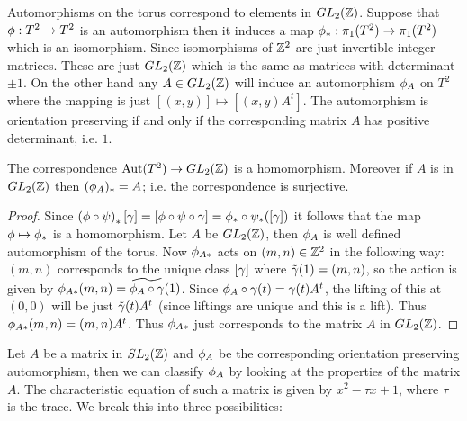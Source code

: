   Automorphisms on the torus correspond to elements in $GL_2(\mathbb{Z})$. Suppose that $\phi:T^2 \to T^2$ is an automorphism then it induces a map $\phi_* :\pi_1(T^2) \to \pi_1(T^2)$ which is an isomorphism. Since isomorphisms of $\mathbb{Z}^2$ are just invertible integer matrices. These are just $GL_2(\mathbb{Z})$ which is the same as matrices with determinant $\pm 1$. On the other hand any $A\in GL_2(\mathbb{Z})$ will induce an automorphism $\phi_A$ on $T^2$ where the mapping is just $[(x,y)] \mapsto [(x,y)A^t]$. The automorphism is orientation preserving if and only if the corresponding matrix $A$ has positive determinant, i.e. $1$.
\begin{proposition}
  The correspondence $\text{Aut}(T^2) \to GL_2(\mathbb{Z})$ is a homomorphism. Moreover if $A$ is in $GL_2(\mathbb{Z})$ then $(\phi_A)_* = A$; i.e. the correspondence is surjective.
\end{proposition}
\begin{proof}
  Since $\left(\phi\circ \psi\right)_*[\gamma] = [\phi\circ\psi \circ \gamma] = \phi_*\circ \psi_*([\gamma])$ it follows that the map $\phi \mapsto \phi_*$ is a homomorphism. Let $A$ be $GL_2(\mathbb{Z})$, then $\phi_A$ is well defined automorphism of the torus. Now $\phi_{A*}$ acts on $(m,n)\in \mathbb{Z}^2$ in the following way: $(m,n)$ corresponds to the unique class $[\gamma]$ where $\tilde{\gamma}(1) = (m,n)$, so the action is given by $\phi_{A*}(m,n) = \widetilde{\phi_A\circ\gamma}(1)$. Since $\phi_A \circ \gamma(t) = \gamma(t)A^t$, the lifting of this at $(0,0)$ will be just $\tilde{\gamma}(t) A^t$ (since liftings are unique and this is a lift). Thus $\phi_{A*}(m,n) = (m,n)A^t$. Thus $\phi_{A*}$ just corresponds to the matrix $A$ in $GL_2(\mathbb{Z})$.
\end{proof}
Let $A$ be a matrix in $SL_2(\mathbb{Z})$ and $\phi_A$ be the corresponding orientation preserving automorphism, then we can classify $\phi_A$ by looking at the properties of the matrix $A$. The characteristic equation of such a matrix is given by $x^2 - \tau x + 1$, where $\tau$ is the trace. We break this into three possibilities:
